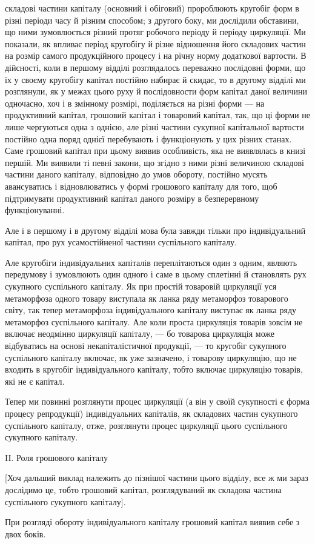 складові частини капіталу (основний і обіговий) пророблюють кругобіг форм
в різні періоди часу й різним способом; з другого боку, ми дослідили обставини,
що ними зумовлюється різний протяг робочого періоду й періоду
циркуляції. Ми показали, як впливає період кругобігу й різне відношення
його складових частин на розмір самого продукційного процесу і на
річну норму додаткової вартости. В дійсності, коли в першому відділі
розглядалось переважно послідовні форми, що їх у своєму кругобігу капітал
постійно набирає й скидає, то в другому відділі ми розглянули, як
у межах цього руху й послідовности форм капітал даної величини одночасно,
хоч і в змінному розмірі, поділяється на різні форми — на продуктивний
капітал, грошовий капітал і товаровий капітал, так, що ці
форми не лише чергуються одна з однією, але різні частини сукупної
капітальної вартости постійно одна поряд однієї перебувають і функціонують
у цих різних станах. Саме грошовий капітал при цьому виявив
особливість, яка не виявлялась в книзі першій. Ми виявили ті певні закони,
що згідно з ними різні величиною складові частини даного капіталу,
відповідно до умов обороту, постійно мусять авансуватись і відновлюватись
у формі грошового капіталу для того, щоб підтримувати
продуктивний капітал даного розміру в безперервному функціонуванні.

Але і в першому і в другому відділі мова була завжди тільки про індивідуальний
капітал, про рух усамостійненої частини суспільного капіталу.

Але кругобіги індивідуальних капіталів переплітаються один з одним,
являють передумову і зумовлюють один одного і саме в цьому сплетінні
й становлять рух сукупного суспільного капіталу. Як при простій товаровій
циркуляції уся метаморфоза одного товару виступала як ланка
ряду метаморфоз товарового світу, так тепер метаморфоза індивідуального
капіталу виступає як ланка ряду метаморфоз суспільного капіталу. Але
коли проста циркуляція товарів зовсім не включає неодмінно циркуляції
капіталу, — бо товарова циркуляція може відбуватись на основі некапіталістичної
продукції, — то кругобіг сукупного суспільного капіталу включає,
як уже зазначено, і товарову циркуляцію, що не входить в кругобіг
індивідуального капіталу, тобто включає циркуляцію товарів, які не є
капітал.

Тепер ми повинні розглянути процес циркуляції (а він у своїй сукупності
є форма процесу репродукції) індивідуальних капіталів, як складових
частин сукупного суспільного капіталу, отже, розглянути процес
циркуляції цього суспільного сукупного капіталу.

II. Роля грошового капіталу

[Хоч дальший виклад належить до пізнішої частини цього відділу,
все ж ми зараз дослідимо це, тобто грошовий капітал, розглядуваний
як складова частина суспільного сукупного капіталу].

При розгляді обороту індивідуального капіталу грошовий капітал виявив
себе з двох боків.
